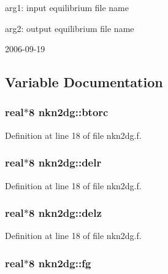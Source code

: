 arg1: input equilibrium file name

arg2: output equilibrium file name

\begin{Desc}
\item[Version:]2006-09-19 \end{Desc}


\subsection{Variable Documentation}
\hypertarget{namespacenkn2dg_76a10b481175bae7917e5c0e19c198ee}{
\subsubsection[btorc]{\setlength{\rightskip}{0pt plus 5cm}real$\ast$8 {\bf nkn2dg::btorc}}}
\label{namespacenkn2dg_76a10b481175bae7917e5c0e19c198ee}




Definition at line 18 of file nkn2dg.f.\hypertarget{namespacenkn2dg_1aaa2e2804a7843d98344bc63f5bea89}{
\subsubsection[delr]{\setlength{\rightskip}{0pt plus 5cm}real$\ast$8 {\bf nkn2dg::delr}}}
\label{namespacenkn2dg_1aaa2e2804a7843d98344bc63f5bea89}




Definition at line 18 of file nkn2dg.f.\hypertarget{namespacenkn2dg_3b404dd21c77dcd73a517b55e31d1de1}{
\subsubsection[delz]{\setlength{\rightskip}{0pt plus 5cm}real$\ast$8 {\bf nkn2dg::delz}}}
\label{namespacenkn2dg_3b404dd21c77dcd73a517b55e31d1de1}




Definition at line 18 of file nkn2dg.f.\hypertarget{namespacenkn2dg_f6426e5fc87f2e775e2e9f5d6efe3ddb}{
\subsubsection[fg]{\setlength{\rightskip}{0pt plus 5cm}real$\ast$8 {\bf nkn2dg::fg}}}
\label{namespacenkn2dg_f6426e5fc87f2e775e2e9f5d6efe3ddb}





